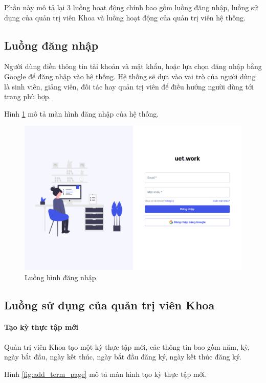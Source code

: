 \documentclass[./../main.tex]{subfiles}
\begin{document}
Phần này mô tả lại 3 luồng hoạt động chính bao gồm luồng đăng nhập, luồng sử dụng của quản trị viên Khoa và luồng hoạt động của quản trị viên hệ thống.

\subsection{Luồng đăng nhập}

Người dùng điền thông tin tài khoản và mật khẩu, hoặc lựa chọn đăng nhập
bằng Google để đăng nhập vào hệ thống. Hệ thống sẽ dựa vào vai trò của
người dùng là sinh viên, giảng viên, đối tác hay quản trị viên để điều
hướng người dùng tới trang phù hợp.

Hình \ref{fig:login_page} mô tả màn hình đăng nhập của hệ thống.

\begin{figure}[]
	\includegraphics[width=\linewidth]{./images/image5.png}
	\caption{Luồng hình đăng nhập}
	\label{fig:login_page}
\end{figure}

\subsection{Luồng sử dụng của quản trị viên Khoa}

\paragraph*{Tạo kỳ thực tập mới}

Quản trị viên Khoa tạo một kỳ thực tập mới, các thông tin bao gồm năm, kỳ, ngày bắt đầu, ngày kết thúc, ngày bắt đầu đăng ký, ngày kết thúc đăng ký.

Hình \ref{fig:add_term_page} mô tả màn hình tạo kỳ thực tập mới.
\end{document}
